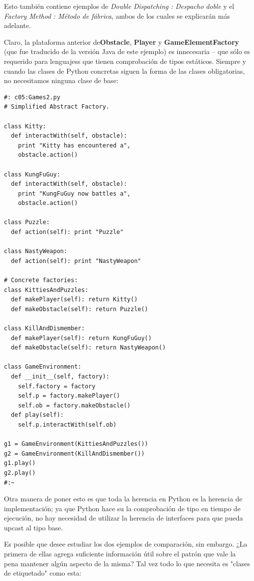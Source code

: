 \documentclass{article}
\begin{document}
Esto también contiene ejemplos de \textit{Double Dispatching : Despacho doble} y el \textit{Factory Method : Método de fábrica}, ambos de los cuales se explicarán más adelante.  \newline

Claro, la plataforma anterior de\textbf{Obstacle}, \textbf{Player} y \textbf{GameElementFactory} (que fue traducido de la versión Java de este ejemplo) es innecesaria – que sólo es requerido para lenguajess que tienen comprobación de tipos estáticos. Siempre y cuando las clases de Python concretas siguen la forma de las clases obligatorias, no necesitamos ninguna clase de base:  \newline

\begin{lstlisting}  
#: c05:Games2.py 
# Simplified Abstract Factory. 

class Kitty: 
  def interactWith(self, obstacle): 
    print "Kitty has encountered a", 
    obstacle.action() 
    
class KungFuGuy: 
  def interactWith(self, obstacle): 
    print "KungFuGuy now battles a", 
    obstacle.action() 
    
class Puzzle: 
  def action(self): print "Puzzle"  
  
class NastyWeapon: 
  def action(self): print "NastyWeapon"  
  
# Concrete factories:
class KittiesAndPuzzles: 
  def makePlayer(self): return Kitty() 
  def makeObstacle(self): return Puzzle() 
  
class KillAndDismember: 
  def makePlayer(self): return KungFuGuy() 
  def makeObstacle(self): return NastyWeapon() 
  
class GameEnvironment: 
  def __init__(self, factory): 
    self.factory = factory 
    self.p = factory.makePlayer()  
    self.ob = factory.makeObstacle() 
  def play(self):  
    self.p.interactWith(self.ob)  
    
g1 = GameEnvironment(KittiesAndPuzzles()) 
g2 = GameEnvironment(KillAndDismember()) 
g1.play()  
g2.play()  
#:~ 
\end{lstlisting}

Otra manera de poner esto es que toda la herencia en Python es la herencia de implementación; ya que Python hace su la comprobación de tipo en tiempo de ejecución, no hay necesidad de utilizar la herencia de interfaces para que pueda upcast al tipo base.  \newline

Es posible que desee estudiar los dos ejemplos de comparación, sin embargo. ¿La primera de ellas agrega suficiente información útil sobre el patrón que vale la pena mantener algún aspecto de la misma? Tal vez todo lo que necesita es "clases de etiquetado" como esta:    \newline
\end{document}
